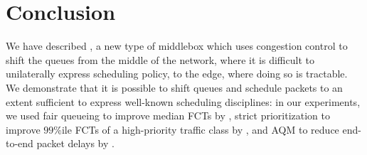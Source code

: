 \section{Conclusion}\label{s:concl}
We have described \name, a new type of middlebox which uses congestion control to shift the queues from the middle of the network, where it is difficult to unilaterally express scheduling policy, to the edge, where doing so is tractable.
We demonstrate that it is possible to shift queues and schedule packets to an extent sufficient to express well-known scheduling disciplines: in our experiments, we used fair queueing to improve median FCTs by \overviewBenefitsBundlerMedianImprovement, strict prioritization to improve $99$\%ile FCTs of a high-priority traffic class by \strictPrioImprovement, and AQM to reduce end-to-end packet delays by \delaysImprovement.

